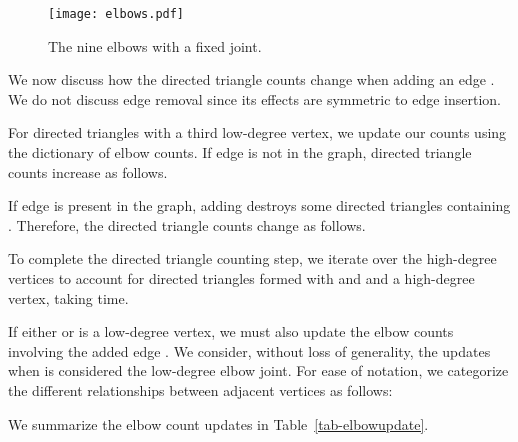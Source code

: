 \documentclass[11pt]{article}
\begin{document}
\begin{figure}[t!]
\vspace{-24pt}
\begin{center}
\texttt{[image: elbows.pdf]}
\end{center}
\vspace{-24pt}
\caption{The nine elbows with a fixed joint.}
\label{fig-elbows}
\vspace{-12pt}
\end{figure}

We now discuss how the directed triangle counts change when adding an edge
. We do not discuss edge removal since its effects are symmetric 
to edge insertion.

For directed triangles with a third low-degree vertex, we update our counts 
using the dictionary of elbow counts. If edge  is 
not in the graph, directed triangle counts increase as follows.

\vspace*{-8pt}
{\small

}

\vspace*{-16pt}
If edge  is present in the graph, adding  destroys
some directed triangles containing . Therefore, the directed 
triangle counts change as follows.

\vspace*{-8pt}
{\small

}
\vspace*{-16pt}

To complete the directed triangle counting step, we iterate over the 
 high-degree vertices to account for directed triangles formed with  
and  and a high-degree vertex, taking  time.

If either  or  is a low-degree vertex, we must also update the elbow 
counts involving the added edge . We consider, without loss of generality,
the updates when  is considered the low-degree elbow joint. For ease of notation,
we categorize the different relationships between adjacent vertices as follows:

\vspace*{-6pt}
{\small
 
}

\vspace*{-6pt}
We summarize the elbow count updates in Table~\ref{tab-elbowupdate}.
\end{document}
